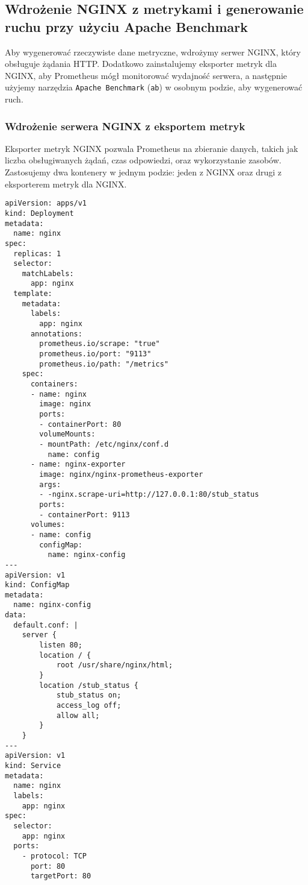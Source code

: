 \documentclass{article}
\begin{document}
\subsection{Wdrożenie NGINX z metrykami i generowanie ruchu przy użyciu Apache Benchmark}

Aby wygenerować rzeczywiste dane metryczne, wdrożymy serwer NGINX, który obsługuje żądania HTTP. Dodatkowo zainstalujemy eksporter metryk dla NGINX, aby Prometheus mógł monitorować wydajność serwera, a następnie użyjemy narzędzia \texttt{Apache Benchmark} (\texttt{ab}) w osobnym podzie, aby wygenerować ruch.

\subsubsection{Wdrożenie serwera NGINX z eksportem metryk}

Eksporter metryk NGINX pozwala Prometheus na zbieranie danych, takich jak liczba obsługiwanych żądań, czas odpowiedzi, oraz wykorzystanie zasobów. Zastosujemy dwa kontenery w jednym podzie: jeden z NGINX oraz drugi z eksporterem metryk dla NGINX.


\begin{lstlisting}
apiVersion: apps/v1
kind: Deployment
metadata:
  name: nginx
spec:
  replicas: 1
  selector:
    matchLabels:
      app: nginx
  template:
    metadata:
      labels:
        app: nginx
      annotations:
        prometheus.io/scrape: "true"
        prometheus.io/port: "9113"
        prometheus.io/path: "/metrics"
    spec:
      containers:
      - name: nginx
        image: nginx
        ports:
        - containerPort: 80
        volumeMounts:
        - mountPath: /etc/nginx/conf.d
          name: config
      - name: nginx-exporter
        image: nginx/nginx-prometheus-exporter
        args:
        - -nginx.scrape-uri=http://127.0.0.1:80/stub_status
        ports:
        - containerPort: 9113
      volumes:
      - name: config
        configMap:
          name: nginx-config
---
apiVersion: v1
kind: ConfigMap
metadata:
  name: nginx-config
data:
  default.conf: |
    server {
        listen 80;
        location / {
            root /usr/share/nginx/html;
        }
        location /stub_status {
            stub_status on;
            access_log off;
            allow all;
        }
    }
---
apiVersion: v1
kind: Service
metadata:
  name: nginx
  labels:
    app: nginx
spec:
  selector:
    app: nginx
  ports:
    - protocol: TCP
      port: 80
      targetPort: 80
\end{lstlisting}
\end{document}
